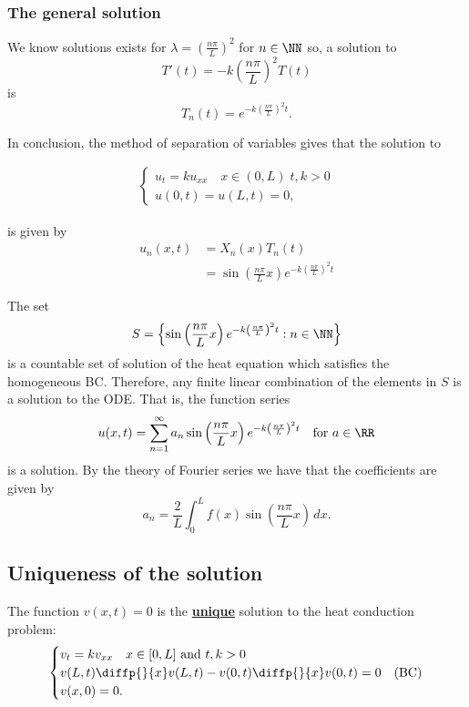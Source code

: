 \documentclass[12pt, a4paper]{article}
\begin{document}
\subsubsection{The general solution}

We know solutions exists for \(\lambda = \left( \frac{n\pi}{L}\right)^2\) for \(n\in \NN\) so, a solution to 
\[T'(t)= - k\left( \frac{n\pi}{L}\right)^2T(t)\]
is 
\[T_n(t) = e^{-k \left( \frac{n\pi}{L} \right)^2 t}.\]

In conclusion, the method of separation of variables gives that the solution to 

\[\begin{aligned}
    \begin{cases}
        u_t=k u_{xx} \quad x\in(0,L) \; t,k>0 \\
        u(0,t)=u(L,t)=0,
    \end{cases}
\end{aligned}\]

is given by 
\[\begin{aligned}
    u_n(x,t) &= X_n(x)T_n(t) \\
    &= \sin\left( \frac{n\pi}{L}x \right)e^{-k \left( \frac{n\pi}{L} \right)^2 t}
\end{aligned}\]

\begin{mdremark}
    The set 
    \[S = \left\{ \sin\left( \frac{n\pi}{L}x \right)e^{-k \left( \frac{n\pi}{L} \right)^2 t} : n \in \NN \right\}\]
    is a countable set of solution of the heat equation which satisfies the homogeneous BC. Therefore, any finite linear combination of the elements in \(S\) is a solution to the ODE. That is, the function series 
    \[u(x,t) = \sum_{n=1}^{\infty} a_n \sin \left( \frac{n\pi}{L}x \right) e^{-k \left( \frac{n\pi}{L} \right)^2 t} \quad \text{for } a\in \RR\]
    is a solution. By the theory of Fourier series we have that the coefficients are given by 
    \[a_n = \frac{2}{L} \int_0^L f(x)\sin\left( \frac{n\pi}{L}x \right) \, dx.\]
\end{mdremark}

\subsection{Uniqueness of the solution}

\begin{mdprop}
    The function \(v(x,t)=0\) is the \underline{\textbf{unique}} solution to the heat conduction problem:
    \[\begin{aligned}
        \begin{cases}
            v_t =kv_{xx}  \quad x \in [0,L] \text{ and } t,k>0 \\
            v(L,t)\diffp{}{x}v(L,t)-v(0,t)\diffp{}{x}v(0,t)= 0 &\text{(BC)} \\
            v(x,0)=0.
        \end{cases}
    \end{aligned}\]
\end{mdprop}
\end{document}
